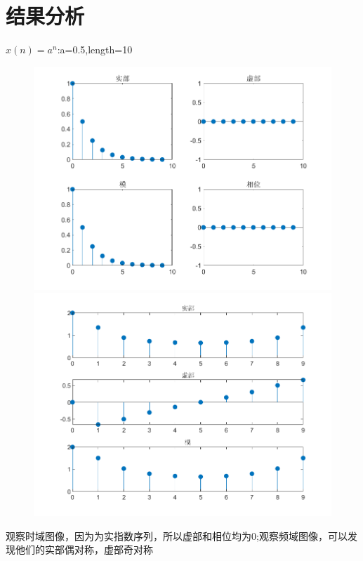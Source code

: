 \documentclass{beamer}
\begin{document}
\section{结果分析}
\begin{frame}{$x(n) = a^n$:a=0.5,length=10}
    \begin{figure}[H]
        \centering
        \begin{minipage}[t]{0.48\textwidth}
        \centering
        \includegraphics[width=\textwidth]{figure/实指数序列_a=05,length=10.png}
        \end{minipage}
        \begin{minipage}[t]{0.48\textwidth}
        \centering
        \includegraphics[width=\textwidth]{figure/频谱_实指数序列_a=05,length=10.png}
        \end{minipage}
    \end{figure}
    \begin{block}{}
        观察时域图像，因为为实指数序列，所以虚部和相位均为0;观察频域图像，可以发现他们的实部偶对称，虚部奇对称
    \end{block}
\end{frame}
\end{document}
